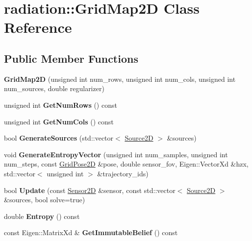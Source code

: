 \hypertarget{classradiation_1_1_grid_map2_d}{}\section{radiation\+:\+:Grid\+Map2D Class Reference}
\label{classradiation_1_1_grid_map2_d}
\subsection*{Public Member Functions}
\begin{DoxyCompactItemize}
\item 
\hypertarget{classradiation_1_1_grid_map2_d_a7ffd2c7bd0b21ce282a8fa632c216129}{}\label{classradiation_1_1_grid_map2_d_a7ffd2c7bd0b21ce282a8fa632c216129} 
{\bfseries Grid\+Map2D} (unsigned int num\+\_\+rows, unsigned int num\+\_\+cols, unsigned int num\+\_\+sources, double regularizer)
\item 
\hypertarget{classradiation_1_1_grid_map2_d_a318bfa44824d9516c25281a3be8875eb}{}\label{classradiation_1_1_grid_map2_d_a318bfa44824d9516c25281a3be8875eb} 
unsigned int {\bfseries Get\+Num\+Rows} () const
\item 
\hypertarget{classradiation_1_1_grid_map2_d_abd22169061eabdfadc130e21dae4cbef}{}\label{classradiation_1_1_grid_map2_d_abd22169061eabdfadc130e21dae4cbef} 
unsigned int {\bfseries Get\+Num\+Cols} () const
\item 
\hypertarget{classradiation_1_1_grid_map2_d_a798ba7c6d39277a4b13002106b868817}{}\label{classradiation_1_1_grid_map2_d_a798ba7c6d39277a4b13002106b868817} 
bool {\bfseries Generate\+Sources} (std\+::vector$<$ \hyperlink{classradiation_1_1_source2_d}{Source2D} $>$ \&sources)
\item 
\hypertarget{classradiation_1_1_grid_map2_d_a3259e3877b8fecdb511e09762f1acdce}{}\label{classradiation_1_1_grid_map2_d_a3259e3877b8fecdb511e09762f1acdce} 
void {\bfseries Generate\+Entropy\+Vector} (unsigned int num\+\_\+samples, unsigned int num\+\_\+steps, const \hyperlink{classradiation_1_1_grid_pose2_d}{Grid\+Pose2D} \&pose, double sensor\+\_\+fov, Eigen\+::\+Vector\+Xd \&hzx, std\+::vector$<$ unsigned int $>$ \&trajectory\+\_\+ids)
\item 
\hypertarget{classradiation_1_1_grid_map2_d_a2f98ca0aa447d0714416a69cb30e9bdf}{}\label{classradiation_1_1_grid_map2_d_a2f98ca0aa447d0714416a69cb30e9bdf} 
bool {\bfseries Update} (const \hyperlink{classradiation_1_1_sensor2_d}{Sensor2D} \&sensor, const std\+::vector$<$ \hyperlink{classradiation_1_1_source2_d}{Source2D} $>$ \&sources, bool solve=true)
\item 
\hypertarget{classradiation_1_1_grid_map2_d_aac80acbc99d934dc06086019af6b1ed6}{}\label{classradiation_1_1_grid_map2_d_aac80acbc99d934dc06086019af6b1ed6} 
double {\bfseries Entropy} () const
\item 
\hypertarget{classradiation_1_1_grid_map2_d_a5214b3693c60dbe583c44c262099ffd4}{}\label{classradiation_1_1_grid_map2_d_a5214b3693c60dbe583c44c262099ffd4} 
const Eigen\+::\+Matrix\+Xd \& {\bfseries Get\+Immutable\+Belief} () const
\end{DoxyCompactItemize}


